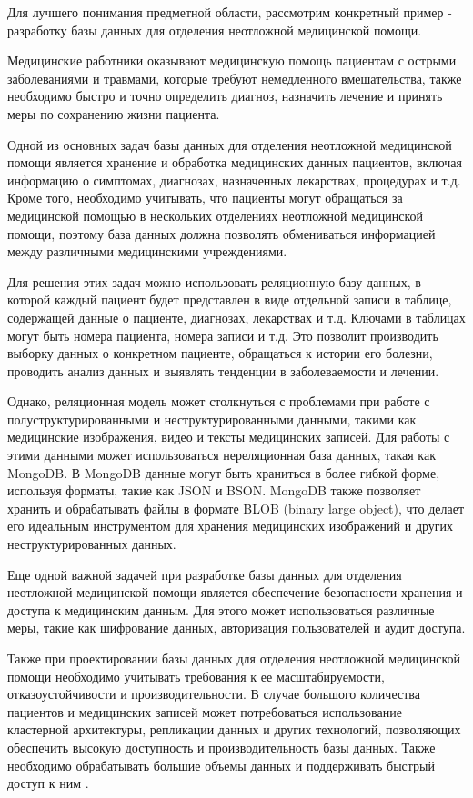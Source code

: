 Для лучшего понимания предметной области, рассмотрим конкретный пример - разработку базы данных для отделения неотложной медицинской помощи.

Медицинские работники оказывают медицинскую помощь пациентам с острыми заболеваниями и травмами, которые требуют немедленного вмешательства, также необходимо быстро и точно определить диагноз, назначить лечение и принять меры по сохранению жизни пациента.

Одной из основных задач базы данных для отделения неотложной медицинской помощи является хранение и обработка медицинских данных пациентов, включая информацию о симптомах, диагнозах, назначенных лекарствах, процедурах и т.д. Кроме того, необходимо учитывать, что пациенты могут обращаться за медицинской помощью в нескольких отделениях неотложной медицинской помощи, поэтому база данных должна позволять обмениваться информацией между различными медицинскими учреждениями.

Для решения этих задач можно использовать реляционную базу данных, в которой каждый пациент будет представлен в виде отдельной записи в таблице, содержащей данные о пациенте, диагнозах, лекарствах и т.д. Ключами в таблицах могут быть номера пациента, номера записи и т.д. Это позволит производить выборку данных о конкретном пациенте, обращаться к истории его болезни, проводить анализ данных и выявлять тенденции в заболеваемости и лечении.

Однако, реляционная модель может столкнуться с проблемами при работе с полуструктурированными и неструктурированными данными, такими как медицинские изображения, видео и тексты медицинских записей. Для работы с этими данными может использоваться нереляционная база данных, такая как MongoDB. В MongoDB данные могут быть храниться в более гибкой форме, используя форматы, такие как JSON и BSON. MongoDB также позволяет хранить и обрабатывать файлы в формате BLOB (binary large object), что делает его идеальным инструментом для хранения медицинских изображений и других неструктурированных данных.

Еще одной важной задачей при разработке базы данных для отделения неотложной медицинской помощи является обеспечение безопасности хранения и доступа к медицинским данным. Для этого может использоваться различные меры, такие как шифрование данных, авторизация пользователей и аудит доступа.

Также при проектировании базы данных для отделения неотложной медицинской помощи необходимо учитывать требования к ее масштабируемости, отказоустойчивости и производительности. В случае большого количества пациентов и медицинских записей может потребоваться использование кластерной архитектуры, репликации данных и других технологий, позволяющих обеспечить высокую доступность и производительность базы данных. Также необходимо обрабатывать большие объемы данных и поддерживать быстрый доступ к ним \cite{online14}.

